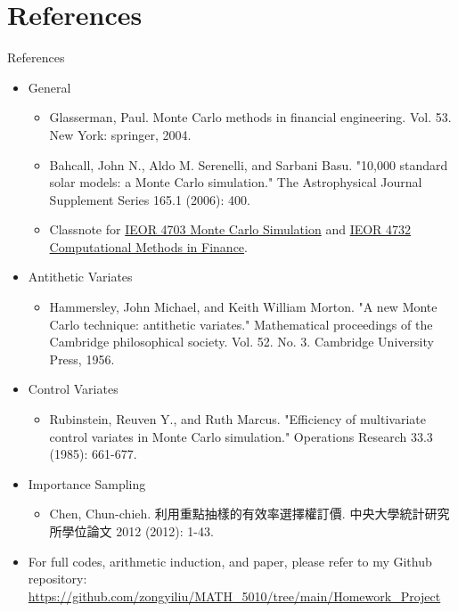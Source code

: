 \documentclass[aspectratio=169,xcolor=dvipsnames]{beamer}
\begin{document}
		\section{References}
	\begin{frame}{References}
	\begin{itemize}
		\item General
		\begin{itemize}
		\item Glasserman, Paul. Monte Carlo methods in financial engineering. Vol. 53. New York: springer, 2004.
		\item Bahcall, John N., Aldo M. Serenelli, and Sarbani Basu. "10,000 standard solar models: a Monte Carlo simulation." The Astrophysical Journal Supplement Series 165.1 (2006): 400.
		\item Classnote for \href{https://www.columbia.edu/~mh2078/MonteCarlo.html}{IEOR 4703 Monte Carlo Simulation} and \href{https://api.pageplace.de/preview/DT0400.9781466576049_A37765636/preview-9781466576049_A37765636.pdf}{IEOR 4732 Computational Methods in Finance}.
	\end{itemize}
\item Antithetic Variates
\begin{itemize}
\item Hammersley, John Michael, and Keith William Morton. "A new Monte Carlo technique: antithetic variates." Mathematical proceedings of the Cambridge philosophical society. Vol. 52. No. 3. Cambridge University Press, 1956.
\end{itemize}

\item Control Variates
\begin{itemize}
	\item Rubinstein, Reuven Y., and Ruth Marcus. "Efficiency of multivariate control variates in Monte Carlo simulation." Operations Research 33.3 (1985): 661-677.
\end{itemize}


	\end{itemize}
	
		\end{frame}
	
	\begin{frame}
		\begin{itemize}
			\item Importance Sampling
			\begin{itemize}
				\item Chen, Chun-chieh. 利用重點抽樣的有效率選擇權訂價. 中央大學統計研究所學位論文 2012 (2012): 1-43.
			\end{itemize}
		\item For full codes, arithmetic induction, and paper, please refer to my Github repository: \url{https://github.com/zongyiliu/MATH_5010/tree/main/Homework_Project}
		\end{itemize}
	\end{frame}
\end{document}
